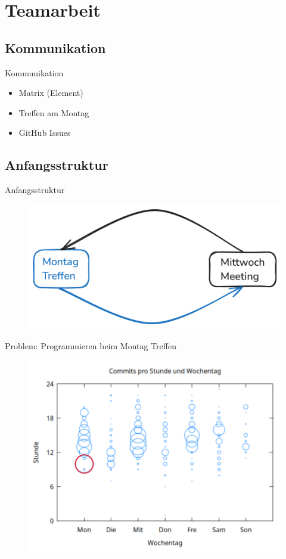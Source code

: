 

\section{Teamarbeit}

\subsection{Kommunikation}
\begin{frame}{Kommunikation}
    \begin{itemize}
        \item Matrix (Element)
        \item Treffen am Montag
        \item GitHub Issues
    \end{itemize}
\end{frame}

\subsection{Anfangsstruktur}
\begin{frame}{Anfangsstruktur}
    \begin{figure}
        \centering
        \includegraphics[width=0.6\linewidth]{pictures/level1}
        \label{fig:lvl1}
    \end{figure}
\end{frame}

\begin{frame}{Problem: Programmieren beim Montag Treffen}
    \begin{figure}
        \centering
        \includegraphics[width=0.52\linewidth]{pictures/hours}
        \label{fig:commit-hours}
    \end{figure}
\end{frame}

